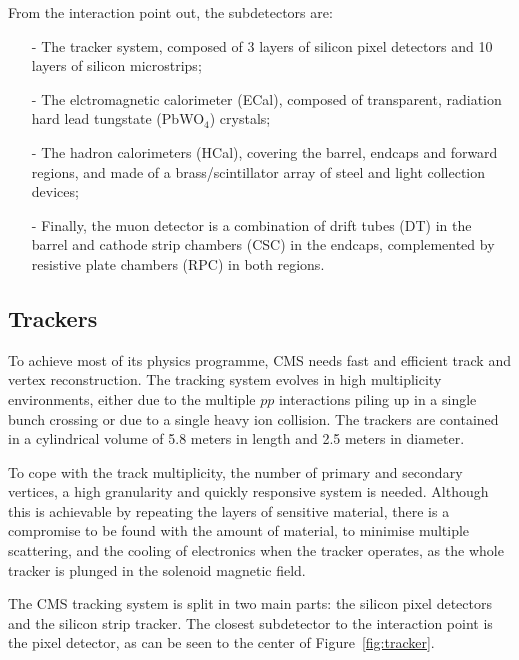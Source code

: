 From the interaction point out, the subdetectors are:

\begin{itemize}
\item[-] The tracker system, composed of 3 layers of silicon pixel
  detectors and 10 layers of silicon microstrips;
\item[-] The elctromagnetic calorimeter (ECal), composed of transparent,
  radiation hard lead tungstate (PbWO$_{4}$) crystals;
\item[-] The hadron calorimeters (HCal), covering the barrel, endcaps
  and forward regions, and made of a brass/scintillator array of steel
  and light collection devices;
\item[-] Finally, the muon detector is a combination of drift tubes (DT) in
  the barrel and cathode strip chambers (CSC) in the endcaps,
  complemented by resistive plate chambers (RPC) in both regions.
\end{itemize}


\subsection{Trackers}
\label{sec:TRK}
To achieve most of its physics programme, CMS needs fast and efficient track
and vertex reconstruction. The tracking system evolves in high
multiplicity environments, either due to the multiple $pp$
interactions piling up in a single bunch crossing or due to a single heavy
ion collision. The trackers are contained in a cylindrical volume of
5.8 meters in length and 2.5 meters in diameter.




To cope with the track multiplicity, the number of primary and
secondary vertices, a high granularity and quickly responsive system
is needed. Although this is achievable by repeating the layers of
sensitive material, there is a compromise to be found with the amount
of material, to minimise multiple scattering, and the cooling of
electronics when the tracker operates, as the whole tracker is plunged
in the solenoid magnetic field. 


The CMS tracking system is split in two main parts: the silicon pixel
detectors and the silicon strip tracker. The closest subdetector to
the interaction point is the pixel detector, as can be seen to the center of Figure~\ref{fig:tracker}.

